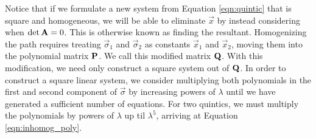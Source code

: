 \documentclass[oneside, 11pt]{book}
\begin{document}
Notice that if we formulate a new system from Equation \ref{eqn:quintic} that is square and homogeneous, we will be able to eliminate $\vec{x}$ by instead considering when $\det\mathbf{A}=0$. This is otherwise known as finding the resultant\cite{Sederberg84}. Homogenizing the path requires treating $\vec{\sigma}_1$ and $\vec{\sigma}_2$ as constants $\vec{x}_1$ and $\vec{x}_2$, moving them into the polynomial matrix $\mathbf{P}$. We call this modified matrix $\mathbf{Q}$. With this modification, we need only construct a square system out of $\mathbf{Q}$. In order to construct a square linear system, we consider multiplying both polynomials in the first and second component of $\vec{\sigma}$ by increasing powers of $\lambda$ until we have generated a sufficient number of equations. For two quintics, we must multiply the polynomials by powers of $\lambda$ up til $\lambda^5$, arriving at Equation \ref{eqn:inhomog_poly}.
\end{document}
